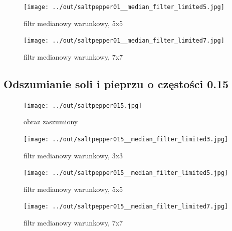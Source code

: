 \documentclass[a4paper,12pt]{article}
\begin{document}
\begin{figure}[h!]
\begin{minipage}[t]{7.5cm}
\begin{center}
\texttt{[image: ../out/saltpepper01\_\_median\_filter\_limited5.jpg]}
\caption{filtr medianowy warunkowy, 5x5}
\end{center}
\end{minipage}
\hfill
\begin{minipage}[t]{7.5cm}
\begin{center}
\texttt{[image: ../out/saltpepper01\_\_median\_filter\_limited7.jpg]}
\caption{filtr medianowy warunkowy, 7x7}
\end{center}
\end{minipage}
\end{figure}


\newpage
\subsection{Odszumianie soli i pieprzu o częstości 0.15}
\begin{figure}[h!]
\begin{minipage}[t]{7.5cm}
\begin{center}
\texttt{[image: ../out/saltpepper015.jpg]}
\caption{obraz zaszumiony}
\end{center}
\end{minipage}
\hfill
\begin{minipage}[t]{7.5cm}
\begin{center}
\texttt{[image: ../out/saltpepper015\_\_median\_filter\_limited3.jpg]}
\caption{filtr medianowy warunkowy, 3x3}
\end{center}
\end{minipage}
\end{figure}

\begin{figure}[h!]
\begin{minipage}[t]{7.5cm}
\begin{center}
\texttt{[image: ../out/saltpepper015\_\_median\_filter\_limited5.jpg]}
\caption{filtr medianowy warunkowy, 5x5}
\end{center}
\end{minipage}
\hfill
\begin{minipage}[t]{7.5cm}
\begin{center}
\texttt{[image: ../out/saltpepper015\_\_median\_filter\_limited7.jpg]}
\caption{filtr medianowy warunkowy, 7x7}
\end{center}
\end{minipage}
\end{figure}
\end{document}
